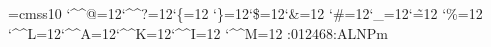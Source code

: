 \font\THFa=cmss10
\begingroup
\catcode`\^^@=12\catcode`\^^?=12\catcode`\{=12
\catcode`\}=12\catcode`\$=12\catcode`\&=12
\catcode`\#=12\catcode`\_=12\catcode`\~=12
\catcode`\%=12
\catcode`\^^L=12\catcode`\^^A=12\catcode`\^^K=12\catcode`\^^I=12
\catcode`\^^M=12
\THFa:012468:ALNPm\endinclude\endgroup
